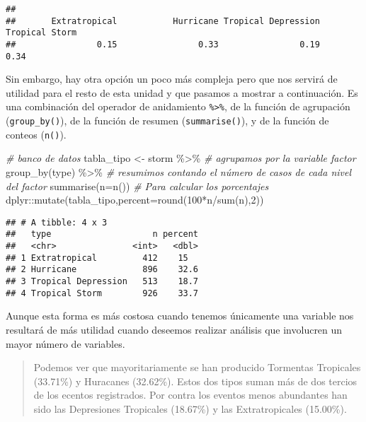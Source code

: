 \documentclass[
]{book}
\newenvironment{Shaded}{\begin{snugshade}}{\end{snugshade}}
\newcommand{\AttributeTok}[1]{\textcolor[rgb]{0.77,0.63,0.00}{#1}}
\newcommand{\CommentTok}[1]{\textcolor[rgb]{0.56,0.35,0.01}{\textit{#1}}}
\newcommand{\DecValTok}[1]{\textcolor[rgb]{0.00,0.00,0.81}{#1}}
\newcommand{\FunctionTok}[1]{\textcolor[rgb]{0.00,0.00,0.00}{#1}}
\newcommand{\NormalTok}[1]{#1}
\newcommand{\OtherTok}[1]{\textcolor[rgb]{0.56,0.35,0.01}{#1}}
\newcommand{\SpecialCharTok}[1]{\textcolor[rgb]{0.00,0.00,0.00}{#1}}
\begin{document}
\begin{verbatim}
## 
##       Extratropical           Hurricane Tropical Depression      Tropical Storm 
##                0.15                0.33                0.19                0.34
\end{verbatim}

Sin embargo, hay otra opción un poco más compleja pero que nos servirá de utilidad para el resto de esta unidad y que pasamos a mostrar a continuación. Es una combinación del operador de anidamiento \texttt{\%\textgreater{}\%}, de la función de agrupación (\texttt{group\_by()}), de la función de resumen (\texttt{summarise()}), y de la función de conteos (\texttt{n()}).

\begin{Shaded}
\begin{Highlighting}[]
\CommentTok{\# banco de datos}
\NormalTok{tabla\_tipo }\OtherTok{\textless{}{-}}\NormalTok{ storm }\SpecialCharTok{\%\textgreater{}\%}  \CommentTok{\# agrupamos por la variable factor}
  \FunctionTok{group\_by}\NormalTok{(type) }\SpecialCharTok{\%\textgreater{}\%}     \CommentTok{\# resumimos contando el número de casos de cada nivel del factor}
  \FunctionTok{summarise}\NormalTok{(}\AttributeTok{n=}\FunctionTok{n}\NormalTok{())       }\CommentTok{\# Para calcular los porcentajes}
\NormalTok{dplyr}\SpecialCharTok{::}\FunctionTok{mutate}\NormalTok{(tabla\_tipo,}\AttributeTok{percent=}\FunctionTok{round}\NormalTok{(}\DecValTok{100}\SpecialCharTok{*}\NormalTok{n}\SpecialCharTok{/}\FunctionTok{sum}\NormalTok{(n),}\DecValTok{2}\NormalTok{))}
\end{Highlighting}
\end{Shaded}

\begin{verbatim}
## # A tibble: 4 x 3
##   type                    n percent
##   <chr>               <int>   <dbl>
## 1 Extratropical         412    15  
## 2 Hurricane             896    32.6
## 3 Tropical Depression   513    18.7
## 4 Tropical Storm        926    33.7
\end{verbatim}

Aunque esta forma es más costosa cuando tenemos únicamente una variable nos resultará de más utilidad cuando deseemos realizar análisis que involucren un mayor número de variables.

\begin{quote}
Podemos ver que mayoritariamente se han producido Tormentas Tropicales (33.71\%) y Huracanes (32.62\%). Estos dos tipos suman más de dos tercios de los ecentos registrados. Por contra los eventos menos abundantes han sido las Depresiones Tropicales (18.67\%) y las Extratropicales (15.00\%).
\end{quote}
\end{document}
